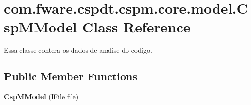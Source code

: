 \hypertarget{classcom_1_1fware_1_1cspdt_1_1cspm_1_1core_1_1model_1_1_csp_m_model}{}\section{com.\+fware.\+cspdt.\+cspm.\+core.\+model.\+Csp\+M\+Model Class Reference}
\label{classcom_1_1fware_1_1cspdt_1_1cspm_1_1core_1_1model_1_1_csp_m_model}


Essa classe contera os dados de analise do codigo.  


\subsection*{Public Member Functions}
\begin{DoxyCompactItemize}
\item 
\mbox{\label{classcom_1_1fware_1_1cspdt_1_1cspm_1_1core_1_1model_1_1_csp_m_model_a35c09e3b9d951b0c6cfbdda824f53c2f}} 
{\bfseries Csp\+M\+Model} (I\+File \hyperlink{classcom_1_1fware_1_1cspdt_1_1cspm_1_1core_1_1model_1_1_csp_m_model_ade0ba2ecf90a09b10dda2370389c41ef}{file})
\end{DoxyCompactItemize}
